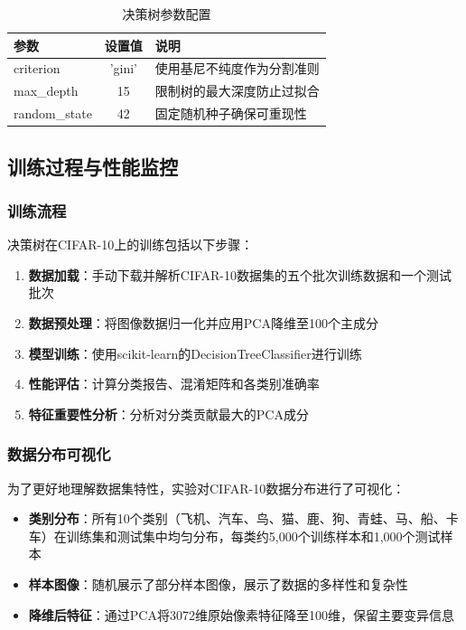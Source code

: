 \documentclass[UTF8]{report}
\theoremstyle{MyLineTheoremStyle} %
\theoremstyle{MyBlockTheoremStyle} %
\theoremstyle{MySubsubsectionStyle} %
\begin{document}
\begin{table}[h]
\centering
\caption{决策树参数配置}
\begin{tabular}{l c l}
\toprule
\textbf{参数} & \textbf{设置值} & \textbf{说明} \\
\midrule
criterion & 'gini' & 使用基尼不纯度作为分割准则 \\
max\_depth & 15 & 限制树的最大深度防止过拟合 \\
random\_state & 42 & 固定随机种子确保可重现性 \\
\bottomrule
\end{tabular}
\end{table}

\subsection{训练过程与性能监控}

\subsubsection{训练流程}
决策树在CIFAR-10上的训练包括以下步骤：

\begin{enumerate}[label=\arabic*.]
    \item \textbf{数据加载}：手动下载并解析CIFAR-10数据集的五个批次训练数据和一个测试批次
    \item \textbf{数据预处理}：将图像数据归一化并应用PCA降维至100个主成分
    \item \textbf{模型训练}：使用scikit-learn的DecisionTreeClassifier进行训练
    \item \textbf{性能评估}：计算分类报告、混淆矩阵和各类别准确率
    \item \textbf{特征重要性分析}：分析对分类贡献最大的PCA成分
\end{enumerate}

\subsubsection{数据分布可视化}
为了更好地理解数据集特性，实验对CIFAR-10数据分布进行了可视化：

\begin{itemize}
    \item \textbf{类别分布}：所有10个类别（飞机、汽车、鸟、猫、鹿、狗、青蛙、马、船、卡车）在训练集和测试集中均匀分布，每类约5,000个训练样本和1,000个测试样本
    \item \textbf{样本图像}：随机展示了部分样本图像，展示了数据的多样性和复杂性
    \item \textbf{降维后特征}：通过PCA将3072维原始像素特征降至100维，保留主要变异信息
\end{itemize}
\end{document}
